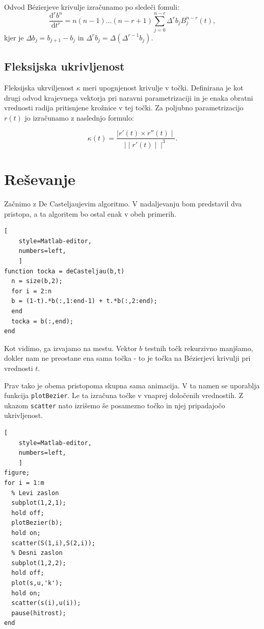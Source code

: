 \documentclass[a4paper,12pt]{article}
\begin{document}
	Odvod B\'ezierjeve krivulje izračunamo po sledeči fomuli:
	$$
	\frac{\mathrm{d}^r b^n}{\mathrm{d}t^r} = n (n-1) \ldots (n - r + 1) \sum_{j=0}^{n-r} \Delta^r b_j B_j^{n-r}(t),
	$$
	kjer je $\Delta b_j = b_{j+1} - b_j$ in $\Delta^r b_j = \Delta (\Delta^{r-1} b_j)$.
	
	\subsection{Fleksijska ukrivljenost}
	
	Fleksijska ukrviljenost $\kappa$ meri upognjenost krivulje v točki. Definirana je kot drugi odvod krajevnega vektorja pri naravni parametrizaciji in je enaka obratni vrednosti radija pritisnjene krožnice v tej točki. Za poljubno parametrizacijo $r(t)$ jo izračunamo z naslednjo formulo:
	
	$$
	\kappa(t) = \frac{\mid r'(t) \times r''(t) \mid}{\mid\mid r'(t) \mid\mid ^3}.
	$$
	
	\section{Reševanje}
	
	Začnimo z De Casteljaujevim algoritmo. V nadaljevanju bom predstavil dva pristopa, a ta algoritem bo ostal enak v obeh primerih.
	
	\begin{lstlisting}[
	style=Matlab-editor,
	numbers=left,
	]
function tocka = deCasteljau(b,t)
  n = size(b,2);
  for i = 2:n
  b = (1-t).*b(:,1:end-1) + t.*b(:,2:end);   
  end
  tocka = b(:,end);
end
	\end{lstlisting}

	Kot vidimo, ga izvajamo na mestu. Vektor $b$ testnih točk rekurzivno manjšamo, dokler nam ne preostane ena sama točka - to je točka na B\'ezierjevi krivulji pri vrednosti $t$.
	
	Prav tako je obema pristopoma skupna sama animacija. V ta namen se uporablja funkcija \lstinline[style=Matlab-editor]!plotBezier!. Le ta izračuna točke v vnaprej določenih vrednostih. Z ukazom \lstinline[style=Matlab-editor]!scatter! nato izrišemo še posamezno točko in njej pripadajočo ukrivljenost.
	
	\begin{lstlisting}[
	style=Matlab-editor,
	numbers=left,
	]
figure;
for i = 1:m
  % Levi zaslon
  subplot(1,2,1);
  hold off;
  plotBezier(b);
  hold on;
  scatter(S(1,i),S(2,i));
  % Desni zaslon
  subplot(1,2,2);
  hold off;
  plot(s,u,'k');
  hold on;
  scatter(s(i),u(i));
  pause(hitrost);
end
	\end{lstlisting}
	
\end{document}
